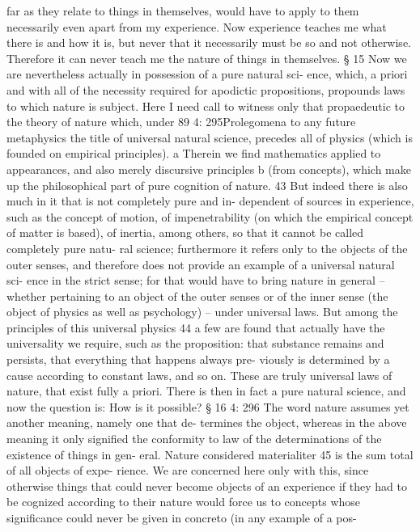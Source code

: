 far as they relate to things in themselves, would have to apply to them
necessarily even apart from my experience. Now experience teaches me
what there is and how it is, but never that it necessarily must be so and
not otherwise. Therefore it can never teach me the nature of things in
themselves.
§ 15
Now we are nevertheless actually in possession of a pure natural sci-
ence, which, a priori and with all of the necessity required for apodictic
propositions, propounds laws to which nature is subject. Here I need call
to witness only that propaedeutic to the theory of nature which, under
89
4: 295Prolegomena to any future metaphysics
the title of universal natural science, precedes all of physics (which is
founded on empirical principles). a Therein we ﬁnd mathematics applied
to appearances, and also merely discursive principles b (from concepts),
which make up the philosophical part of pure cognition of nature. 43
But indeed there is also much in it that is not completely pure and in-
dependent of sources in experience, such as the concept of motion, of
impenetrability (on which the empirical concept of matter is based), of
inertia, among others, so that it cannot be called completely pure natu-
ral science; furthermore it refers only to the objects of the outer senses,
and therefore does not provide an example of a universal natural sci-
ence in the strict sense; for that would have to bring nature in general –
whether pertaining to an object of the outer senses or of the inner sense
(the object of physics as well as psychology) – under universal laws. But
among the principles of this universal physics 44 a few are found that
actually have the universality we require, such as the proposition: that
substance remains and persists, that everything that happens always pre-
viously is determined by a cause according to constant laws, and so on.
These are truly universal laws of nature, that exist fully a priori. There
is then in fact a pure natural science, and now the question is: How is it
possible?
§ 16
4: 296
The word nature assumes yet another meaning, namely one that de-
termines the object, whereas in the above meaning it only signiﬁed the
conformity to law of the determinations of the existence of things in gen-
eral. Nature considered materialiter 45 is the sum total of all objects of expe-
rience. We are concerned here only with this, since otherwise things
that could never become objects of an experience if they had to be
cognized according to their nature would force us to concepts whose
signiﬁcance could never be given in concreto (in any example of a pos-
